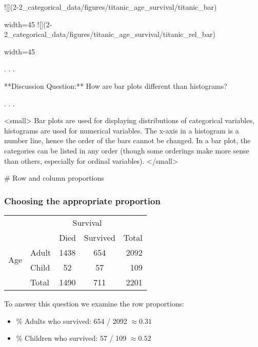 ![](2-2_categorical_data/figures/titanic_age_survival/titanic_bar){width=45%
![](2-2_categorical_data/figures/titanic_age_survival/titanic_rel_bar){width=45%

. . .

**Discussion Question:**  
How are bar plots different than histograms?

. . .

<small>
Bar plots are used for displaying distributions of categorical variables,  
histograms are used for numerical variables.  
The x-axis in a histogram is a number line, hence the order of the bars cannot be changed.  
In a bar plot, the categories can be listed in any order (though some orderings make more sense than others, especially for ordinal variables).
</small>



# Row and column proportions



\begin{frame}
\frametitle{Choosing the appropriate proportion}


\begin{center}
\begin{tabular}{l l cc r}
					               & 			 & \multicolumn{2}{c}{{Survival}} \\
  \cline{3-4}
					               &			 & Died	 & Survived	& Total \\ 
  \cline{2-5}
\multirow{2}{*}{{Age}}& Adult & 1438  & 654 	  	& 2092 \\ 
  					             & Child & 52 	 & 57	 	    & 109\\ 
  \cline{2-5}
  					             & Total & 1490  & 711	    &  2201 \\
  \cline{2-5}
\end{tabular}
\end{center}

\pause

To answer this question we examine the row proportions: 

\pause

\begin{itemize}

\item \% Adults who survived: 654 / 2092 $\approx 0.31$ \\

\pause

\item \% Children who survived: 57 / 109 $\approx 0.52$ \\


\end{itemize}
\end{frame}}}
